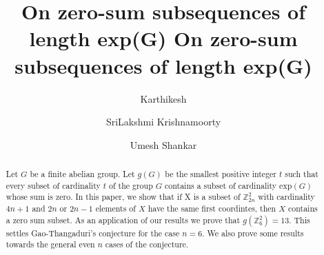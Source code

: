 \documentclass[reqno,10pt]{amsart}
\begin{document}
\title[On zero-sum subsequences of length exp(G)]{\small {On zero-sum subsequences of length exp(G)}
}

%



\title{On zero-sum subsequences of length exp(G)}
%
\author{Karthikesh}
\address{KARTHIKESH
\newline
\ \ INDIAN INSTITUTE OF SCIENCE EDUCATION AND RESEARCH, TRIVENDRUM, INDIA.}
 

\author{SriLakshmi Krishnamoorty}
\address{SRILAKSHMI KRISHNAMOORTHY
 \newline
INDIAN INSTITUTE OF SCIENCE EDUCATION AND RESEARCH, TRIVENDRUM, INDIA.}


\author{Umesh Shankar}
\address{UMESH SHANKAR
\newline
\ \ INDIAN INSTITUTE OF SCIENCE EDUCATION AND RESEARCH, TRIVENDRUM, INDIA.} 

\begin{abstract}
Let $G$ be a finite abelian group.  Let $g(G)$ be the smallest positive integer $t$ such that every subset of
cardinality $t$ of the group $G$  contains a subset of cardinality $\mathrm{exp}(G)$ whose sum
is zero. In this paper, we show that if X is a subset of $\mathbb{Z}^2_{2n}$ with cardinality $4n+1$ and $2n$ or $2n-1$ elements of $X$ have the same first coordintes, then $X$ contains a zero sum subset. As an application of our results we prove that $g(\mathbb{Z}^2_6) = 13.$ This settles
Gao-Thangaduri's conjecture for the case $n=6.$ We also prove some results towards the general even $n$ cases of the conjecture. 
\end{abstract}
\maketitle
\end{document}
